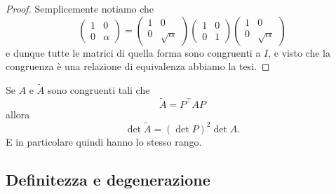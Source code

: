 \documentclass[11pt]{scrartcl}
\begin{document}
	\begin{proof}
		Semplicemente notiamo che
		$$\begin{pmatrix}
			1 & 0 \\
			0 & \alpha
		\end{pmatrix}=
		\begin{pmatrix}
			1 & 0 \\
			0 & \sqrt{\alpha}
		\end{pmatrix}
		\begin{pmatrix}
			1 & 0 \\
			0 & 1
		\end{pmatrix}
		\begin{pmatrix}
			1 & 0 \\
			0 & \sqrt{\alpha}
		\end{pmatrix}
		$$ 
		e dunque tutte le matrici di quella forma sono congruenti a $I$, e visto che la congruenza è una relazione di equivalenza abbiamo la tesi.
	\end{proof}
	\begin{remark}
		Se $A$ e $\tilde{A}$ sono congruenti tali che
		$$\tilde{A}=P^\intercal A P$$
		allora
		$$\det\tilde{A} = \left(\det P\right)^2\det  A.$$
		E in particolare quindi hanno lo stesso rango.
	\end{remark}
	
	\subsection{Definitezza e degenerazione}
	
\end{document}
